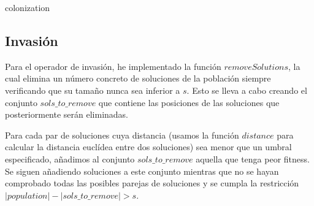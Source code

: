 \documentclass[10pt,a4paper]{article}
\begin{document}
\begin{algorithm}[H]
	\caption{colonization}
\end{algorithm}





\subsection{Invasión}

Para el operador de invasión, he implementado la función $removeSolutions$, la cual elimina un número concreto de soluciones de la población siempre verificando que su tamaño nunca sea inferior a $s$. Esto se lleva a cabo creando el conjunto $sols\_to\_remove$ que contiene las posiciones de las soluciones que posteriormente serán eliminadas.

Para cada par de soluciones cuya distancia (usamos la función $distance$ para calcular la distancia euclídea entre dos soluciones) sea menor que un umbral especificado, añadimos al conjunto $sols\_to\_remove$ aquella que tenga peor fitness. Se siguen añadiendo soluciones a este conjunto mientras que no se hayan comprobado todas las posibles parejas de soluciones y se cumpla la restricción $|population|-|sols\_to\_remove|>s$.\\
\end{document}
